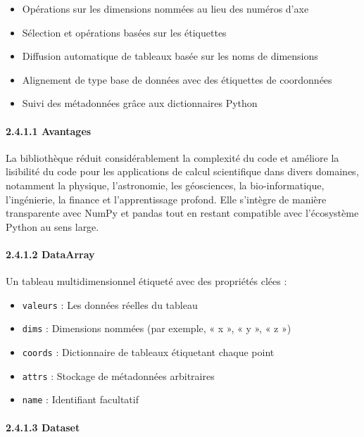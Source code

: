 \documentclass[
]{article}
\begin{document}
\begin{itemize}
\item
  Opérations sur les dimensions nommées au lieu des numéros d'axe
\item
  Sélection et opérations basées sur les étiquettes
\item
  Diffusion automatique de tableaux basée sur les noms de dimensions
\item
  Alignement de type base de données avec des étiquettes de coordonnées
\item
  Suivi des métadonnées grâce aux dictionnaires Python
\end{itemize}

\paragraph{\texorpdfstring{{2.4.1.1}
Avantages}{2.4.1.1 Avantages}}\label{avantages}

La bibliothèque réduit considérablement la complexité du code et
améliore la lisibilité du code pour les applications de calcul
scientifique dans divers domaines, notamment la physique, l'astronomie,
les géosciences, la bio-informatique, l'ingénierie, la finance et
l'apprentissage profond. Elle s'intègre de manière transparente avec
NumPy et pandas tout en restant compatible avec l'écosystème Python au
sens large.

\paragraph{\texorpdfstring{{2.4.1.2}
DataArray}{2.4.1.2 DataArray}}\label{dataarray}

Un tableau multidimensionnel étiqueté avec des propriétés clées :

\begin{itemize}
\item
  \texttt{valeurs} : Les données réelles du tableau
\item
  \texttt{dims} : Dimensions nommées (par exemple, « x », « y », « z »)
\item
  \texttt{coords} : Dictionnaire de tableaux étiquetant chaque point
\item
  \texttt{attrs} : Stockage de métadonnées arbitraires
\item
  \texttt{name} : Identifiant facultatif
\end{itemize}

\paragraph{\texorpdfstring{{2.4.1.3}
Dataset}{2.4.1.3 Dataset}}\label{dataset}
\end{document}
